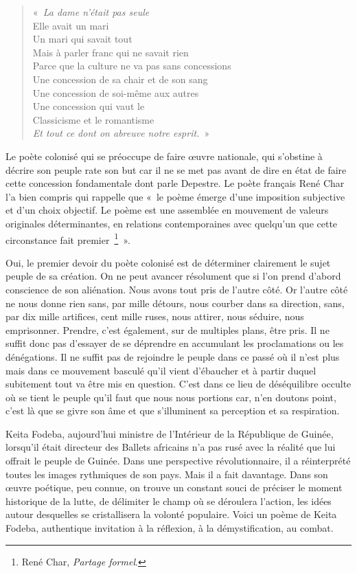 \documentclass[french,twoside]{book} %
\begin{document}
\begin{verse}
«\emph{ La dame n’était pas seule}\\
Elle avait un mari\\
Un mari qui savait tout\\
Mais à parler franc qui ne savait rien\\
Parce que la culture ne va pas sans concessions\\
Une concession de sa chair et de son sang\\
Une concession de soi-même aux autres\\
Une concession qui vaut le\\
Classicisme et le romantisme\\
\emph{Et tout ce dont on abreuve notre esprit.} »\\
\end{verse}

\noindent Le poète colonisé qui se préoccupe de faire œuvre nationale, qui s’obstine à décrire son peuple rate son but car il ne se met pas avant de dire en état de faire cette concession fondamentale   dont parle Depestre. Le poète français René Char l’a bien compris qui rappelle que « le poème émerge d’une imposition subjective et d’un choix objectif. Le poème est une assemblée en mouvement de valeurs originales déterminantes, en relations contemporaines avec quelqu’un que cette circonstance fait premier \footnote{René Char, \emph{Partage formel}.} ».\par
Oui, le premier devoir du poète colonisé est de déterminer clairement le sujet peuple de sa création. On ne peut avancer résolument que si l’on prend d’abord conscience de son aliénation. Nous avons tout pris de l’autre côté. Or l’autre côté ne nous donne rien sans, par mille détours, nous courber dans sa direction, sans, par dix mille artifices, cent mille ruses, nous attirer, nous séduire, nous emprisonner. Prendre, c’est également, sur de multiples plans, être pris. Il ne suffit donc pas d’essayer de se déprendre en accumulant les proclamations ou les dénégations. Il ne suffit pas de rejoindre le peuple dans ce passé où il n’est plus mais dans ce mouvement basculé qu’il vient d’ébaucher et à partir duquel subitement tout va être mis en question. C’est dans ce lieu de déséquilibre occulte où se tient le peuple qu’il faut que nous nous portions car, n’en doutons point, c’est là que se givre son âme et que s’illuminent sa perception et sa respiration.\par
Keita Fodeba, aujourd’hui ministre de l’Intérieur de la République de Guinée, lorsqu’il était directeur des Ballets africains n’a pas rusé avec la réalité que lui offrait le peuple de Guinée. Dans une perspective révolutionnaire, il a réinterprété toutes les images rythmiques de son pays. Mais il a fait davantage. Dans son œuvre poétique, peu connue, on trouve un constant souci de préciser le moment historique de la lutte, de délimiter le champ où se déroulera l’action, les idées autour desquelles se cristallisera la volonté populaire. Voici un poème de Keita Fodeba, authentique invitation à la réflexion, à la démystification, au combat.\par
 
\end{document}
